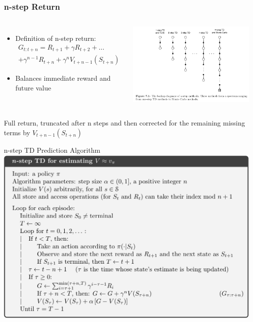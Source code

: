 \documentclass{beamer}
\begin{document}
    \begin{frame}
        \frametitle{n-step Return}
        \begin{columns}
            \begin{itemize}
                \item Definition of n-step return:
                \begin{multline*}
                    G_{t:t+n} = R_{t+1} + \gamma R_{t+2} + \ldots \\
                    + \gamma^{n-1} R_{t+n} + \gamma^n V_{t+n-1}(S_{t+n})
                \end{multline*}
                \item Balances immediate reward and future value
            \end{itemize}
            \includegraphics[width=\textwidth]{public/n-step-return}
        \end{columns}
\vspace{20pt}
        Full return, truncated after n steps and then corrected for the
remaining missing terms by $V_{t+n-1}(S_{t+n})$
    \end{frame}

    \begin{frame}{n-step TD Prediction Algorithm}
        \includegraphics[width=\textwidth]{public/n-step-td-prediction-alg}
     \end{frame}
\end{document}
